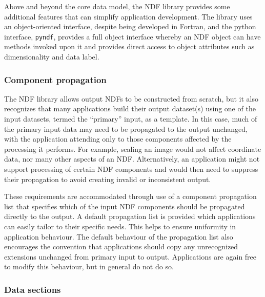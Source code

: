 \documentclass[final,authoryear,5p,times,twocolumn]{elsarticle}
\begin{document}
Above and beyond the core data model, the NDF library provides some
additional features that can simplify application development. The
library uses an object-oriented interface, despite being
developed in Fortran, and the python interface, \texttt{pyndf}, provides a full object
interface whereby an NDF object can have methods invoked upon it and
provides direct access to object attributes such as dimensionality and
data label.

\subsubsection{Component propagation}

The NDF library allows output NDFs to be constructed from scratch, but
it also recognizes that many applications build their output dataset(s)
using one of the input datasets, termed the ``primary'' input, as a
template. In this case, much of the primary input data may need to be
propagated to the output unchanged, with the application attending only
to those components affected by the processing it performs. For example,
scaling an image would not affect coordinate data, nor many other
aspects of an NDF. Alternatively, an application might not support
processing of certain NDF components and would then need to suppress
their propagation to avoid creating invalid or inconsistent output.

These requirements are accommodated through use of a component
propagation list that specifies which of the input NDF components should
be propagated directly to the output. A default propagation list is
provided which applications can easily tailor to their specific needs.
This helps to ensure uniformity in application behaviour. The default
behaviour of the propagation list also encourages the convention that
applications should copy any unrecognized extensions unchanged from
primary input to output. Applications are again free to modify this
behaviour, but in general do not do so.

\subsubsection{Data sections}
\end{document}
